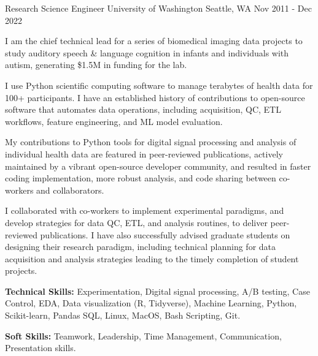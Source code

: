 

\begin{cventries}

  \cventry
  {Research Science Engineer} %
  {University of Washington} %
  {Seattle, WA} %
  {Nov 2011 - Dec 2022} %
  {
    \begin{cvitems} %
      \item {I am the chief technical lead for a series of biomedical imaging data projects to study auditory speech & language cognition in infants and individuals with autism, generating \$1.5M in funding for the lab.}
      \item {I use Python scientific computing software to manage terabytes of health data for 100+ participants. I have an established history of contributions to open-source software that automates data operations, including acquisition, QC, ETL workflows, feature engineering, and ML model evaluation.}
      \item {My contributions to Python tools for digital signal processing and analysis of individual health data are featured in peer-reviewed publications, actively maintained by a vibrant open-source developer community, and resulted in faster coding implementation, more robust analysis, and code sharing between co-workers and collaborators.}
      \item {I collaborated with co-workers to implement experimental paradigms, and develop strategies for data QC, ETL, and analysis routines, to deliver peer-reviewed publications. I have also successfully advised graduate students on designing their research paradigm, including technical planning for data acquisition and analysis strategies leading to the timely completion of student projects.}
      \item {\textbf{Technical Skills:} Experimentation, Digital signal processing, A/B testing, Case Control, EDA, Data visualization (R, Tidyverse), Machine Learning, Python, Scikit-learn, Pandas SQL, Linux, MacOS, Bash Scripting, Git.}
      \item {\textbf{Soft Skills:} Teamwork, Leadership, Time Management, Communication, Presentation skills.}
    \end{cvitems}
  }


\end{cventries}
